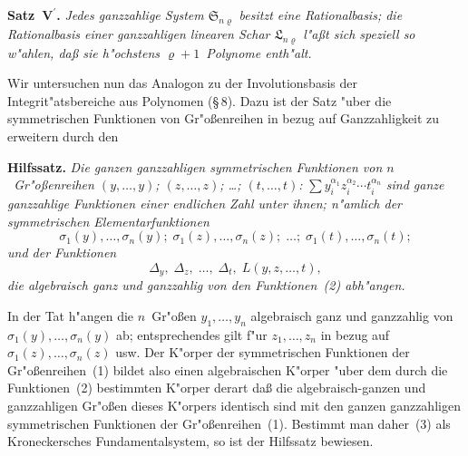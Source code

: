\documentclass[11pt,a4paper]{article}
\begin{document}
\medskip
\noindent
\textbf{Satz~$\mathbf{V}^{\boldsymbol{\prime}}$.} \emph{Jedes ganzzahlige System $\mathfrak{S}_{n\varrho}$ besitzt eine Rationalbasis;
die Rationalbasis einer ganzzahligen linearen Schar $\mathfrak{L}_{n\varrho}$ l"{a}\ss{}t sich speziell
so w"{a}hlen, da\ss{} sie h"{o}chstens $\varrho+1$~Polynome enth"{a}lt.}

Wir untersuchen nun das Analogon zu der Involutionsbasis der
Integrit"{a}tsbereiche aus Polynomen (\S\,8). Dazu ist der Satz "{u}ber die
symmetrischen Funktionen von Gr"{o}\ss{}enreihen in bezug auf Ganzzahligkeit
zu erweitern durch den

\medskip
\noindent
\textbf{Hilfssatz.} \emph{Die ganzen ganzzahligen symmetrischen Funktionen von
$n$~Gr"{o}\ss{}enreihen $(y,\dots,y)$; $(z,\dots,z)$; \dots{}; $(t,\dots,t)$:}
$\sum y_{i}^{\alpha_{1}}z_{i}^{\alpha_{2}}\cdots t_{i}^{\alpha_{n}}$
\emph{sind ganze ganzzahlige Funktionen einer endlichen Zahl unter ihnen;
n"{a}mlich der symmetrischen Elementarfunktionen}
\begin{equation}
\sigma_{1}(y),\dots,\sigma_{n}(y);\;\sigma_{1}(z),\dots,\sigma_{n}(z);\;\dots;\;
\sigma_{1}(t),\dots,\sigma_{n}(t);
\tag{2}
\end{equation}
\emph{und der Funktionen}
\begin{equation}
\Delta_{y},\;\Delta_{z},\;\dots,\;\Delta_{t},\;L(y,z,\dots,t),
\tag{3}
\end{equation}
\emph{die algebraisch ganz und ganzzahlig von den Funktionen~(2) abh"{a}ngen.}

In der Tat h"{a}ngen die $n$~Gr"{o}\ss{}en $y_{1},\dots,y_{n}$ algebraisch ganz und
ganzzahlig von $\sigma_{1}(y),\dots,\sigma_{n}(y)$ ab; entsprechendes gilt f"{u}r $z_{1},\dots,z_{n}$
in bezug auf $\sigma_{1}(z),\dots,\sigma_{n}(z)$ usw. Der K"{o}rper der symmetrischen
Funktionen der Gr"{o}\ss{}enreihen~(1) bildet also einen algebraischen K"{o}rper
"{u}ber dem durch die Funktionen~(2) bestimmten K"{o}rper derart da\ss{} die
algebraisch-ganzen und ganzzahligen Gr"{o}\ss{}en dieses K"{o}rpers identisch
sind mit den ganzen ganzzahligen symmetrischen Funktionen der
Gr"{o}\ss{}enreihen~(1). Bestimmt man daher~(3) als Kroneckersches
Fundamentalsystem, so ist der Hilfssatz bewiesen.
\end{document}
